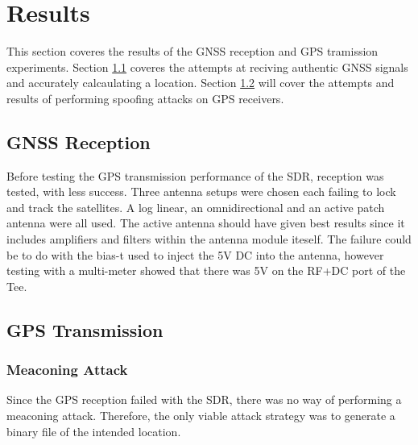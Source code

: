
\chapter{Results} %

\label{Chapter5} %

This section coveres the results of the GNSS reception and GPS tramission experiments. Section \ref{sec:Res_GNSSReception} coveres the attempts at reciving authentic GNSS
signals and accurately calcaulating a location. Section \ref{sec:Res_GPSTransmission} will cover the attempts and results of performing spoofing attacks on GPS receivers.

\section{GNSS Reception} \label{sec:Res_GNSSReception}
Before testing the GPS transmission performance of the SDR, reception was tested, with less success. Three antenna setups were chosen each failing to lock and track the
satellites. A log linear, an omnidirectional and an active patch antenna were all used. The active antenna should have given best results since it includes amplifiers and
filters within the antenna module iteself. The failure could be to do with the bias-t used to inject the 5V DC into the antenna, however testing with a multi-meter showed
that there was 5V on the RF+DC port of the Tee.



\section{GPS Transmission} \label{sec:Res_GPSTransmission}

\subsection{Meaconing Attack}
Since the GPS reception failed with the SDR, there was no way of performing a meaconing attack. Therefore, the only viable attack strategy was to generate a binary file
of the intended location. 

